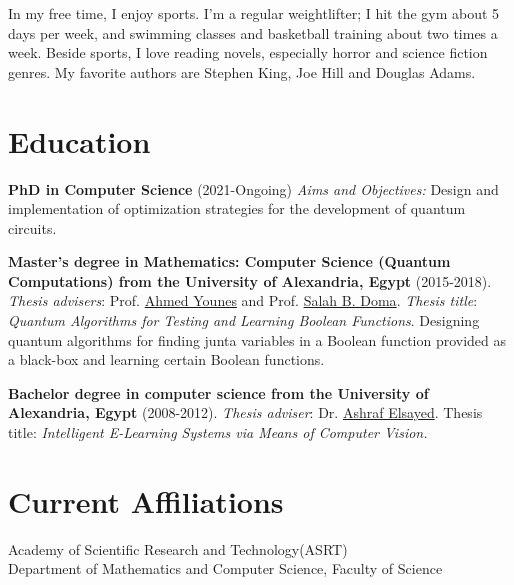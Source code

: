 \documentclass[margin,line,a4paper]{resume}
\begin{document}
\begin{resume}
        In my free time,  I enjoy sports. I'm a regular weightlifter; I hit the gym about 5 days per week, and swimming classes and basketball training about two times a week. Beside sports, I love reading novels, especially horror and science fiction genres. My favorite authors are Stephen King, Joe Hill and Douglas Adams.

        
    \section{\mysidestyle Education} 
    \textbf{PhD in Computer Science} (2021-Ongoing)
     \emph{Aims and Objectives:} Design and implementation of optimization strategies for the development of quantum circuits.    

    \textbf{Master's degree in Mathematics: Computer Science (Quantum Computations) from the University of Alexandria, Egypt} (2015-2018). 
    \emph{Thesis advisers}: Prof.  \href{https://scholar.google.com.eg/citations?user=CZz2XFIAAAAJ&hl=en}{Ahmed Younes} and Prof. \href{https://scholar.google.com.eg/citations?hl=en&user=YFeMsegAAAAJ&view_op=list_works&sortby=pubdate}{Salah B. Doma}. 
     \emph{Thesis title}: \textit{Quantum Algorithms for Testing and Learning Boolean Functions}. Designing quantum algorithms for finding junta variables in a Boolean function provided as a black-box and learning certain Boolean functions.

    \textbf{Bachelor degree in computer science from the University of Alexandria, Egypt}
    (2008-2012).  \emph{Thesis adviser}: Dr. \href{https://scholar.google.com.eg/citations?hl=en&user=G9tQkdIAAAAJ&view_op=list_works&sortby=pubdate}{Ashraf Elsayed}.
    Thesis title: \textit{Intelligent E-Learning Systems via Means of Computer Vision.}

%    

\section{\mysidestyle Current Affiliations}\vspace{1mm}
\begin{description}
    \item[Academy of Scientific Research and Technology(ASRT)]
    \item[Department of Mathematics and Computer Science, Faculty of Science] 
\end{description}



\end{resume}
\end{document}
